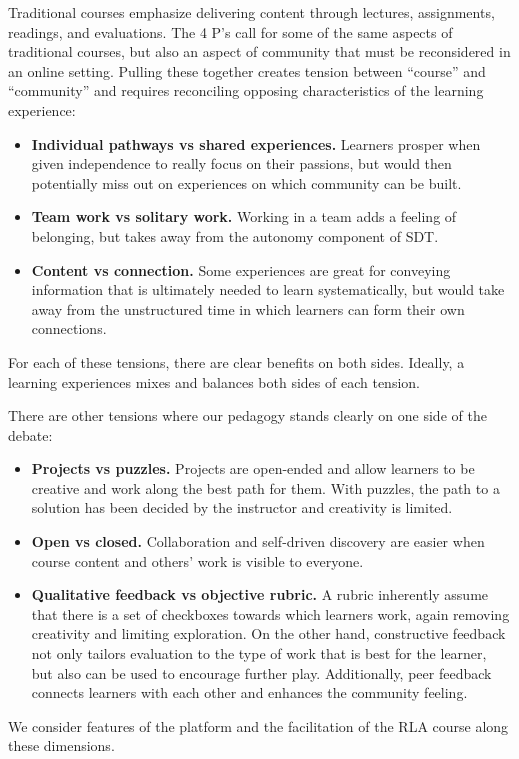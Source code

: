 \documentclass[12pt,twoside]{mitthesis}
\begin{document}
Traditional courses emphasize delivering content through lectures, assignments, readings, and evaluations. The 4 P's call for some of the same aspects of traditional courses, but also an aspect of community that must be reconsidered in an online setting. Pulling these together creates tension between ``course'' and ``community'' and requires reconciling opposing characteristics of the learning experience:
\begin{itemize}
\item \textbf{Individual pathways vs shared experiences.} Learners prosper when given independence to really focus on their passions, but would then potentially miss out on experiences on which community can be built. 
\item \textbf{Team work vs solitary work.} Working in a team adds a feeling of belonging, but takes away from the autonomy component of SDT.
\item \textbf{Content vs connection.} Some experiences are great for conveying information that is ultimately needed to learn systematically, but would take away from the unstructured time in which learners can form their own connections.
\end{itemize} 
For each of these tensions, there are clear benefits on both sides. Ideally, a learning experiences mixes and balances both sides of each tension.\cite{learningcreativelearning} 

There are other tensions where our pedagogy stands clearly on one side of the debate:
\begin{itemize}
\item \textbf{Projects vs puzzles.} Projects are open-ended and allow learners to be creative and work along the best path for them. With puzzles, the path to a solution has been decided by the instructor and creativity is limited.
\item \textbf{Open vs closed.} Collaboration and self-driven discovery are easier when course content and others' work is visible to everyone.
\item \textbf{Qualitative feedback vs objective rubric.} A rubric inherently assume that there is a set of checkboxes towards which learners work, again removing creativity and limiting exploration. On the other hand, constructive feedback not only tailors evaluation to the type of work that is best for the learner, but also can be used to encourage further play. Additionally, peer feedback connects learners with each other and enhances the community feeling.
\end{itemize}
We consider features of the platform and the facilitation of the RLA course along these dimensions.
\end{document}
